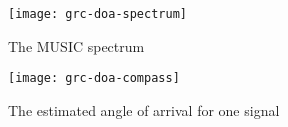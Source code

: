 \begin{figure}[H]
    \centering
    \texttt{[image: grc-doa-spectrum]}
    \caption{The MUSIC spectrum}
    \label{fig:doa-sp}
\end{figure}
\begin{figure}[H]
    \centering
    \texttt{[image: grc-doa-compass]}
    \caption{The estimated angle of arrival for one signal}
    \label{fig:doa-compass}
\end{figure}
